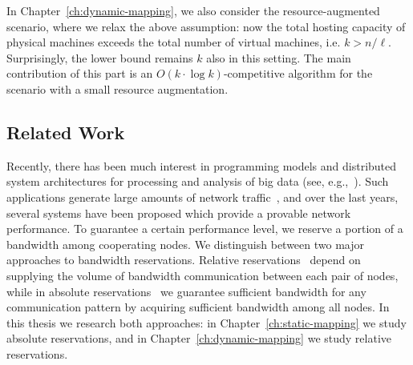 In Chapter~\ref{ch:dynamic-mapping}, we also consider the resource-augmented scenario, where we relax the above assumption: now the total hosting capacity of physical machines exceeds the total number of virtual machines, i.e. $k > n/\ell$.
Surprisingly, the lower bound remains $k$ also in this setting.
The main contribution of this part is an $O(k\cdot \log k)$-competitive algorithm for the scenario with a small resource augmentation.



\subsection{Related Work}


Recently, there has been much interest in programming models and distributed
system architectures for processing and analysis of big data (see, e.g.,~\cite{mapreduce,nodb,shark}).
Such applications
generate large amounts of network traffic~\cite{orchestra,talk-about,amazonbw},
and over the last years, several systems have been proposed which provide a provable network performance.
To guarantee a certain performance level, we reserve a portion of a bandwidth among cooperating nodes.
We distinguish between two major approaches to bandwidth reservations.
Relative reservations~\cite{faircloud,elasticswitch,seawall} depend on supplying the volume of bandwidth communication between each pair of nodes, while in absolute reservations~\cite{oktopus,secondnet,drl,gatekeeper,proteus} we guarantee sufficient bandwidth for any communication pattern by acquiring sufficient bandwidth among all nodes.
In this thesis we research both approaches: in Chapter~\ref{ch:static-mapping} we study absolute reservations, and in Chapter~\ref{ch:dynamic-mapping} we study relative reservations.

\medskip

